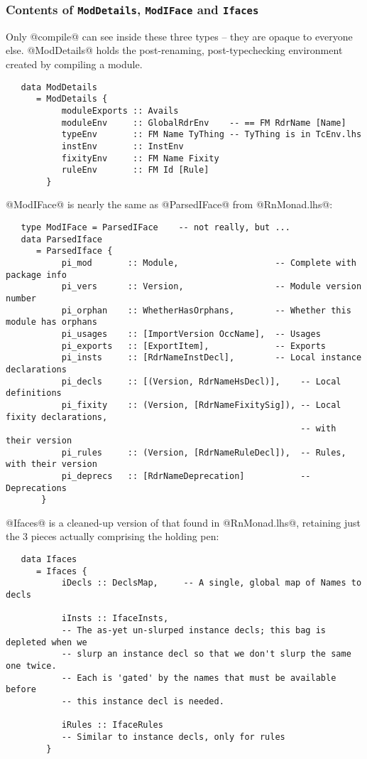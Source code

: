 \documentclass[11pt]{article}
\begin{document}
\subsubsection{Contents of \mbox{\tt ModDetails}, 
               \mbox{\tt ModIFace} and \mbox{\tt Ifaces}}
Only @compile@ can see inside these three types -- they are opaque to
everyone else.  @ModDetails@ holds the post-renaming,
post-typechecking environment created by compiling a module.

\begin{verbatim}
   data ModDetails
      = ModDetails {
           moduleExports :: Avails
           moduleEnv     :: GlobalRdrEnv    -- == FM RdrName [Name]
           typeEnv       :: FM Name TyThing -- TyThing is in TcEnv.lhs
           instEnv       :: InstEnv
           fixityEnv     :: FM Name Fixity
           ruleEnv       :: FM Id [Rule]
        }
\end{verbatim}

@ModIFace@ is nearly the same as @ParsedIFace@ from @RnMonad.lhs@:
\begin{verbatim}
   type ModIFace = ParsedIFace    -- not really, but ...
   data ParsedIface
      = ParsedIface {
           pi_mod       :: Module,                   -- Complete with package info
           pi_vers      :: Version,                  -- Module version number
           pi_orphan    :: WhetherHasOrphans,        -- Whether this module has orphans
           pi_usages    :: [ImportVersion OccName],  -- Usages
           pi_exports   :: [ExportItem],             -- Exports
           pi_insts     :: [RdrNameInstDecl],        -- Local instance declarations
           pi_decls     :: [(Version, RdrNameHsDecl)],    -- Local definitions
           pi_fixity    :: (Version, [RdrNameFixitySig]), -- Local fixity declarations, 
                                                          -- with their version
           pi_rules     :: (Version, [RdrNameRuleDecl]),  -- Rules, with their version
           pi_deprecs   :: [RdrNameDeprecation]           -- Deprecations
       }
\end{verbatim}

@Ifaces@ is a cleaned-up version of that found in @RnMonad.lhs@, 
retaining just the 3 pieces actually comprising the holding pen:
\begin{verbatim}
   data Ifaces 
      = Ifaces {
           iDecls :: DeclsMap,     -- A single, global map of Names to decls

           iInsts :: IfaceInsts,
           -- The as-yet un-slurped instance decls; this bag is depleted when we
           -- slurp an instance decl so that we don't slurp the same one twice.
           -- Each is 'gated' by the names that must be available before
           -- this instance decl is needed.

           iRules :: IfaceRules
           -- Similar to instance decls, only for rules
        }
\end{verbatim}
\end{document}
